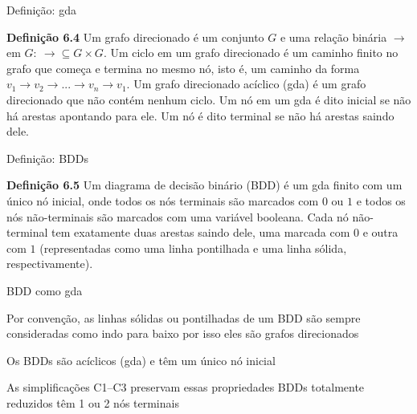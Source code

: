 \expandafter\documentclass\expandafter[table, usenames, svgnames, dvipsnames,14pt, \classopts]{beamer}
\begin{document}
\begin{frame}{Definição: gda}

    \begin{block}{\textbf{Definição 6.4}}
        Um grafo direcionado é um conjunto $\mathit{G}$ e uma relação binária $\rightarrow$ em $\mathit{G}:~\rightarrow \subseteq \mathit{G} \times \mathit{G}$. Um ciclo em um grafo direcionado é um caminho finito no grafo que começa e termina no mesmo nó, isto é, um caminho da forma $v_1 \rightarrow v_2 \rightarrow ... \rightarrow v_n \rightarrow v_1$. Um grafo direcionado acíclico (gda) é um grafo direcionado que não contém nenhum ciclo. Um nó em um gda é dito inicial se não há arestas apontando para ele. Um nó é dito terminal se não há arestas saindo dele.
    \end{block}

\end{frame}

\begin{frame}{Definição: \uppercase{BDD}s}

    \begin{block}{\textbf{Definição 6.5}}
        Um diagrama de decisão binário (BDD) é um gda finito com um único nó inicial, onde todos os nós terminais são marcados com $0$ ou $1$ e todos os nós não-terminais são marcados com uma variável booleana. Cada nó não-terminal tem exatamente duas arestas saindo dele, uma marcada com $0$ e outra com $1$ (representadas como uma linha pontilhada e uma linha sólida, respectivamente).
    \end{block}

\end{frame}

\begin{frame}{\uppercase{BDD} como gda}

    \begin{outline}
        \1 Por convenção, as linhas sólidas ou pontilhadas de um BDD são sempre consideradas como indo para baixo
            \2[-] por isso eles são grafos direcionados
        
        \vspace{1em}
        
        \1 Os BDDs são acíclicos (gda) e têm um único nó inicial

        \vspace{1em}
        
        \1 As simplificações C1--C3 preservam essas propriedades
            \2[-] BDDs totalmente reduzidos têm 1 ou 2 nós terminais
    \end{outline}

\end{frame}
\end{document}
